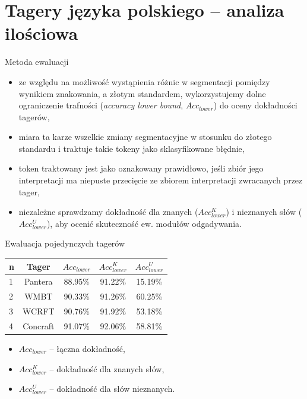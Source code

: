 \documentclass{beamer}
\begin{document}
\section{Tagery języka polskiego -- analiza ilościowa}
\frame{\sectionpage}

\begin{frame}{Metoda ewaluacji}
\begin{itemize}
\item ze względu na możliwość wystąpienia różnic w segmentacji pomiędzy wynikiem znakowania, a złotym standardem, wykorzystujemy dolne ograniczenie trafności (\emph{accuracy lower bound}, $Acc_{lower}$) do oceny dokładności tagerów,
\item miara ta karze wszelkie zmiany segmentacyjne w stosunku do złotego standardu i traktuje takie tokeny jako sklasyfikowane błędnie,
\item token traktowany jest jako oznakowany prawidłowo, jeśli zbiór jego interpretacji ma niepuste przecięcie ze zbiorem interpretacji zwracanych przez tager,
\item niezależne sprawdzamy dokładność dla znanych ($Acc^K_{lower}$) i nieznanych słów ($Acc^U_{lower}$), aby ocenić skuteczność ew. modułów odgadywania.
\end{itemize}
\end{frame}

\begin{frame}{Ewaluacja pojedynczych tagerów}
\begin{center}
\begin{tabular}{lcccc} \hline
n & Tager 		& $Acc_{lower}$	& $Acc^K_{lower}$	& $Acc^U_{lower}$	\\ \hline
1 & Pantera   & 88.95\%   & 91.22\% & 15.19\% \\
2 & WMBT	 	& 90.33\%		& 91.26\%	& 60.25\%	\\
3 & WCRFT	 	& 90.76\%		& 91.92\%	& 53.18\%	\\
4 & Concraft	& 91.07\%		& 92.06\%	& 58.81\%	\\
\end{tabular}
\end{center}
\begin{itemize}
\item $Acc_{lower}$ -- łączna dokładność,
\item $Acc^K_{lower}$ -- dokładność dla znanych słów,
\item $Acc^U_{lower}$ -- dokładność dla słów nieznanych.
\end{itemize}
\end{frame}
\end{document}
